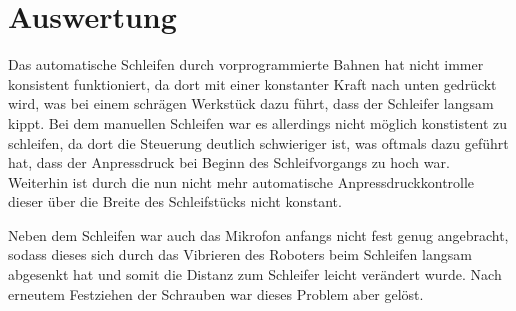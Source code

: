 \section{Auswertung}

Das automatische Schleifen durch vorprogrammierte Bahnen hat nicht immer konsistent funktioniert, da dort mit einer konstanter Kraft nach unten gedrückt wird, was bei einem schrägen Werkstück dazu führt, dass der Schleifer langsam kippt. Bei dem manuellen Schleifen war es allerdings nicht möglich konstistent zu schleifen, da dort die Steuerung deutlich schwieriger ist, was oftmals dazu geführt hat, dass der Anpressdruck bei Beginn des Schleifvorgangs zu hoch war. Weiterhin ist durch die nun nicht mehr automatische Anpressdruckkontrolle dieser über die Breite des Schleifstücks nicht konstant. 

Neben dem Schleifen war auch das Mikrofon anfangs nicht fest genug angebracht, sodass dieses sich durch das Vibrieren des Roboters beim Schleifen langsam abgesenkt hat und somit die Distanz zum Schleifer leicht verändert wurde. Nach erneutem Festziehen der Schrauben war dieses Problem aber gelöst.


\endinput
